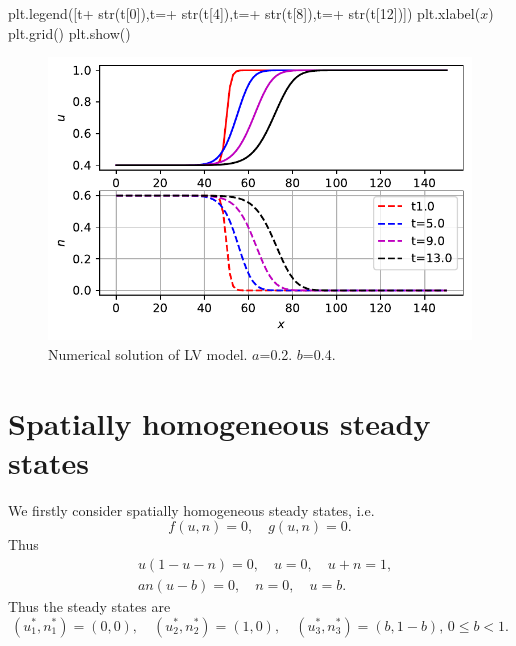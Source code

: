 \documentclass[
  letterpaper,
  DIV=11,
  numbers=noendperiod]{scrreprt}
\newenvironment{Shaded}{\begin{snugshade}}{\end{snugshade}}
\newcommand{\BuiltInTok}[1]{\textcolor[rgb]{0.00,0.23,0.31}{#1}}
\newcommand{\DecValTok}[1]{\textcolor[rgb]{0.68,0.00,0.00}{#1}}
\newcommand{\NormalTok}[1]{\textcolor[rgb]{0.00,0.23,0.31}{#1}}
\newcommand{\OperatorTok}[1]{\textcolor[rgb]{0.37,0.37,0.37}{#1}}
\newcommand{\StringTok}[1]{\textcolor[rgb]{0.13,0.47,0.30}{#1}}
\theoremstyle{plain}
\theoremstyle{definition}
\theoremstyle{plain}
\theoremstyle{remark}
\begin{document}
\begin{Shaded}
\begin{Highlighting}[]
\NormalTok{plt.legend([}\StringTok{\textquotesingle{}t\textquotesingle{}}\OperatorTok{+} \BuiltInTok{str}\NormalTok{(t[}\DecValTok{0}\NormalTok{]),}\StringTok{\textquotesingle{}t=\textquotesingle{}}\OperatorTok{+} \BuiltInTok{str}\NormalTok{(t[}\DecValTok{4}\NormalTok{]),}\StringTok{\textquotesingle{}t=\textquotesingle{}}\OperatorTok{+} \BuiltInTok{str}\NormalTok{(t[}\DecValTok{8}\NormalTok{]),}\StringTok{\textquotesingle{}t=\textquotesingle{}}\OperatorTok{+} \BuiltInTok{str}\NormalTok{(t[}\DecValTok{12}\NormalTok{])])}
\NormalTok{plt.xlabel(}\StringTok{\textquotesingle{}$x$\textquotesingle{}}\NormalTok{)}
\NormalTok{plt.grid()}
\NormalTok{plt.show()}
\end{Highlighting}
\end{Shaded}

\begin{figure}[H]

{\centering \includegraphics{LotkaVolteraPDE_files/figure-pdf/fig-lvpde-output-1.pdf}

}

\caption{\label{fig-lvpde}Numerical solution of LV model. \(a\)=0.2.
\(b\)=0.4.}

\end{figure}

\hypertarget{spatially-homogeneous-steady-states}{%
\section{Spatially homogeneous steady
states}\label{spatially-homogeneous-steady-states}}

We firstly consider spatially homogeneous steady states, i.e. \[
f(u,n) =0, \quad g(u,n) = 0.
\] Thus \[
\begin{aligned}
 &u(1-u-n) = 0,  \quad  u =0, \quad u+n=1,\\
 & an(u-b) = 0,  \quad n =0, \quad u =b.
 \end{aligned}
\] Thus the steady states are \[
 (u_1^\ast, n_1^\ast)= (0,0), \quad (u_2^\ast, n_2^\ast)= (1,0), \quad (u_3^\ast, n_3^\ast)= (b,1-b), \, 0\leq b <1.
\]
\end{document}

